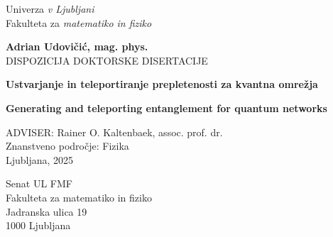 \documentclass{article}
\begin{document}
\begin{titlepage}
	\begin{center}
		{\LARGE Univerza \textit{v Ljubljani}} \\[0.1cm]
		{\LARGE Fakulteta za \textit{matematiko in fiziko}} \\[1cm]
		\begin{figure}[h]
			\centering
			\def\svgwidth{0.5\columnwidth}
			
			\label{fig:UL logo}
		\end{figure}
		{\large \textbf{Adrian Udovičić, mag. phys.}}\\[0.1cm]
		{\sc DISPOZICIJA DOKTORSKE DISERTACIJE}\\
		\vspace{1cm}

		{\bf \Large Ustvarjanje in teleportiranje prepletenosti za kvantna omrežja}\\
		\vspace{1cm}

		{\bf \Large Generating and teleporting entanglement for quantum networks}\\


		\vspace{3cm}

		{\large ADVISER: Rainer O. Kaltenbaek, assoc. prof. dr.\\

			\vspace{2cm}
			Znanstveno področje: Fizika\\
			\vspace{1cm}
			Ljubljana, 2025\date{}}
	\end{center}
\end{titlepage}
\clearpage
\pagestyle{plain}

\vspace{1cm}

\noindent Senat UL FMF\\
Fakulteta za matematiko in fiziko\\
Jadranska ulica 19\\
1000 Ljubljana\\
\end{document}
